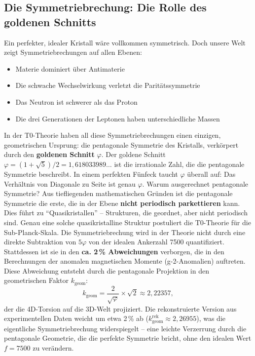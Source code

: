 	\subsection{Die Symmetriebrechung: Die Rolle des goldenen Schnitts}
	Ein perfekter, idealer Kristall wäre vollkommen symmetrisch. Doch unsere Welt zeigt Symmetriebrechungen auf allen Ebenen:
	\begin{itemize}
		\item Materie dominiert über Antimaterie
		\item Die schwache Wechselwirkung verletzt die Paritätssymmetrie
		\item Das Neutron ist schwerer als das Proton
		\item Die drei Generationen der Leptonen haben unterschiedliche Massen
	\end{itemize}
	In der T0-Theorie haben all diese Symmetriebrechungen einen einzigen, geometrischen Ursprung: die pentagonale Symmetrie des Kristalls, verkörpert durch den \textbf{goldenen Schnitt} \(\varphi\).
	Der goldene Schnitt \(\varphi = (1+\sqrt{5})/2 = 1{,}618033989\ldots\) ist die irrationale Zahl, die die pentagonale Symmetrie beschreibt. In einem perfekten Fünfeck taucht \(\varphi\) überall auf: Das Verhältnis von Diagonale zu Seite ist genau \(\varphi\).
	Warum ausgerechnet pentagonale Symmetrie? Aus tiefliegenden mathematischen Gründen ist die pentagonale Symmetrie die erste, die in der Ebene \textbf{nicht periodisch parkettieren} kann. Dies führt zu \enquote{Quasikristallen} -- Strukturen, die geordnet, aber nicht periodisch sind. Genau eine solche quasikristalline Struktur postuliert die T0-Theorie für die Sub-Planck-Skala.
	Die Symmetriebrechung wird in der Theorie nicht durch eine direkte Subtraktion von \(5\varphi\) von der idealen Ankerzahl 7500 quantifiziert. Stattdessen ist sie in den \textbf{ca. 2\,\% Abweichungen} verborgen, die in den Berechnungen der anomalen magnetischen Momente (g-2-Anomalien) auftreten. Diese Abweichung entsteht durch die pentagonale Projektion in den geometrischen Faktor \(k_\text{geom}\):
	\begin{equation}
		k_\text{geom} = \frac{2}{\sqrt{\varphi}} \times \sqrt{2} \approx 2{,}22357,
	\end{equation}
	der die 4D-Torsion auf die 3D-Welt projiziert. Die rekonstruierte Version aus experimentellen Daten weicht um etwa 2\,\% ab (\(k_\text{geom}^\text{rek} \approx 2{,}26955\)), was die eigentliche Symmetriebrechung widerspiegelt -- eine leichte Verzerrung durch die pentagonale Geometrie, die die perfekte Symmetrie bricht, ohne den idealen Wert \(f = 7500\) zu verändern.
